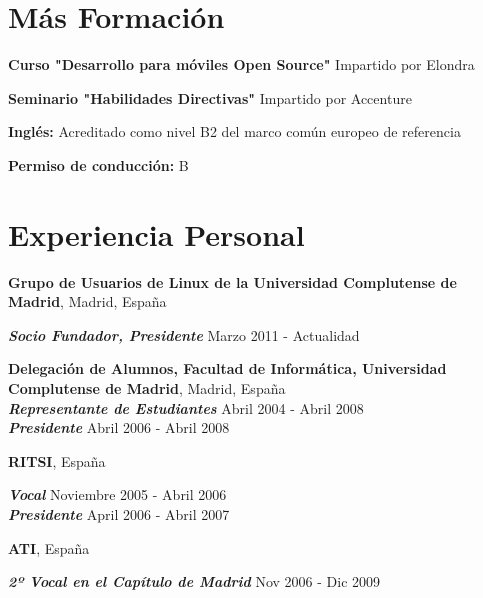 \documentclass[margin,line]{resume}
\begin{document}
\begin{resume}
\section{\sc Más Formación } 
\begin{list1}
\item[] {\bf Curso "Desarrollo para móviles Open Source"} Impartido por Elondra
\item[] {\bf Seminario "Habilidades Directivas"} Impartido por Accenture
\item[] {\bf Inglés:} Acreditado como nivel B2 del marco común europeo de referencia
\item[] {\bf Permiso de conducción:} B
\end{list1}


\section{\sc Experiencia Personal}
{\bf Grupo de Usuarios de Linux de la Universidad Complutense de
Madrid}, Madrid, España

\vspace{-.3cm}
{\bf \em Socio Fundador, Presidente} \hfill { Marzo 2011 - Actualidad}


{\bf Delegación de Alumnos, Facultad de Informática, Universidad Complutense de
Madrid}, Madrid, España\\

\vspace{-.7cm}
{\bf \em Representante de Estudiantes} \hfill {Abril 2004 - Abril 2008}\\
{\bf \em Presidente} \hfill { Abril 2006 - Abril 2008}

{\bf RITSI}, España

\vspace{-.3cm}
{\bf \em Vocal} \hfill { Noviembre 2005 - Abril 2006}\\
{\bf \em Presidente} \hfill { April 2006 - Abril 2007}

{\bf ATI}, España

\vspace{-.3cm}
{\bf \em 2º Vocal en el Capítulo de Madrid} \hfill {%
  Nov 2006 - Dic 2009}\\

\end{resume}
\end{document}
